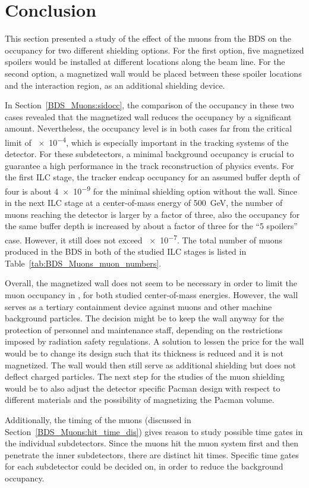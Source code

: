 \section{Conclusion}
This section presented a study of the effect of the muons from the BDS on the \sid occupancy for two different shielding options.
For the first option, five magnetized spoilers would be installed at different locations along the beam line.
For the second option, a magnetized wall would be placed between these spoiler locations and the interaction region, as an additional shielding device.

In Section~\ref{BDS_Muons:sidocc}, the comparison of the occupancy in these two cases revealed that the magnetized wall reduces the occupancy by a significant amount.
Nevertheless, the occupancy level is in both cases far from the critical limit of \num{e-4}, which is especially important in the tracking systems of the \sid detector.
For these subdetectors, a minimal background occupancy is crucial to guarantee a high performance in the track reconstruction of physics events.
For the first ILC stage, the \sid tracker endcap occupancy for an assumed buffer depth of four is about \num{4e-9} for the minimal shielding option without the wall.
Since in the next ILC stage at a center-of-mass energy of \SI{500}{\GeV}, the number of muons reaching the detector is larger by a factor of three, also the occupancy for the same buffer depth is increased by about a factor of three for the ``5 spoilers'' case.
However, it still does not exceed \num{e-7}.
The total number of muons produced in the BDS in both of the studied ILC stages is listed in Table~\ref{tab:BDS_Muons_muon_numbers}.

Overall, the magnetized wall does not seem to be necessary in order to limit the muon occupancy in \sid, for both studied center-of-mass energies.
However, the wall serves as a tertiary containment device against muons and other machine background particles.
The decision might be to keep the wall anyway for the protection of personnel and maintenance staff, depending on the restrictions imposed by radiation safety regulations.
A solution to lessen the price for the wall would be to change its design such that its thickness is reduced and it is not magnetized.
The wall would then still serve as additional shielding but does not deflect charged particles. The next step for the studies of the muon shielding would be to also adjust the detector specific Pacman design with respect to different materials and the possibility of magnetizing the Pacman volume.

Additionally, the timing of the muons (discussed in Section~\ref{BDS_Muons:hit_time_dis}) gives reason to study possible time gates in the individual subdetectors.
Since the muons hit the muon system first and then penetrate the inner subdetectors, there are distinct hit times.
Specific time gates for each subdetector could be decided on, in order to reduce the background occupancy.